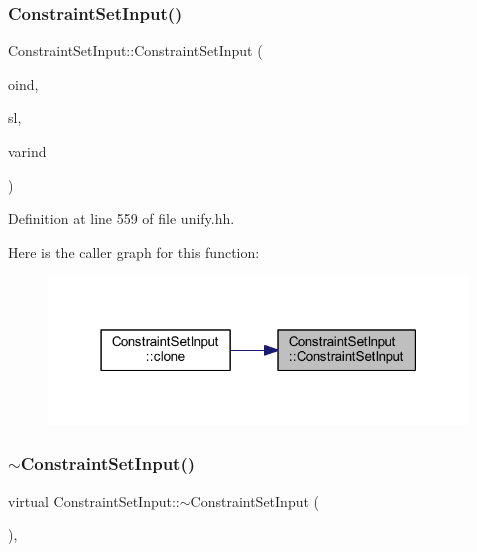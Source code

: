 \subsubsection{\texorpdfstring{ConstraintSetInput()}{ConstraintSetInput()}}
{\footnotesize\ttfamily Constraint\+Set\+Input\+::\+Constraint\+Set\+Input (\begin{DoxyParamCaption}\item[{int4}]{oind,  }\item[{\mbox{\hyperlink{class_r_h_s_constant}{R\+H\+S\+Constant}} $\ast$}]{sl,  }\item[{int4}]{varind }\end{DoxyParamCaption})\hspace{0.3cm}{\ttfamily [inline]}}



Definition at line 559 of file unify.\+hh.

Here is the caller graph for this function\+:
\nopagebreak
\begin{figure}[H]
\begin{center}
\leavevmode
\includegraphics[width=316pt]{class_constraint_set_input_ac292c6084e63ffcc02cfea98c59cb9b9_icgraph}
\end{center}
\end{figure}
\mbox{\label{class_constraint_set_input_ac5bd23615e88373c91bb729c2ac80357}} 
\subsubsection{\texorpdfstring{$\sim$ConstraintSetInput()}{~ConstraintSetInput()}}
{\footnotesize\ttfamily virtual Constraint\+Set\+Input\+::$\sim$\+Constraint\+Set\+Input (\begin{DoxyParamCaption}\item[{void}]{ }\end{DoxyParamCaption})\hspace{0.3cm}{\ttfamily [inline]}, {\ttfamily [virtual]}}



